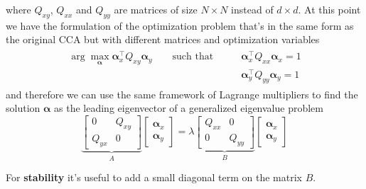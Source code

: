 where $Q_{xy}$, $Q_{xx}$ and $Q_{yy}$ are matrices of size $N \times N$ instead of $d \times d$. At this point we have the formulation of the optimization problem that's in the same form as the original CCA but with different matrices and optimization variables
\begin{align}
	\begin{split}
		\arg\max_\mathbf{\alpha} \mathbf{\alpha}_x^\top Q_{xy} \mathbf{\alpha}_y \qquad \text{such that} \qquad & \mathbf{\alpha}_x^\top Q_{xx} \mathbf{\alpha}_x = 1 \\
		& \mathbf{\alpha}_y^\top Q_{yy} \mathbf{\alpha}_y = 1
	\end{split}
\end{align}
and therefore we can use the same framework of Lagrange multipliers to find the solution $\mathbf{\alpha}$ as the leading eigenvector of a generalized eigenvalue problem
\begin{equation}
	\underbrace{
		\begin{bmatrix}
			0 &  Q_{xy} \\
			Q_{yx} & 0
	\end{bmatrix}}_A \begin{bmatrix}
	\mathbf{\alpha}_x \\ \mathbf{\alpha}_y
\end{bmatrix} = \lambda \underbrace{\begin{bmatrix}
	Q_{xx} & 0 \\
	0 & Q_{yy}
	\end{bmatrix}}_{B} \begin{bmatrix}
	\mathbf{\alpha}_x \\ \mathbf{\alpha}_y
\end{bmatrix}
\end{equation}

\begin{note}
	For \textbf{stability} it's useful to add a small diagonal term on the matrix $B$.
\end{note}

\newpage
